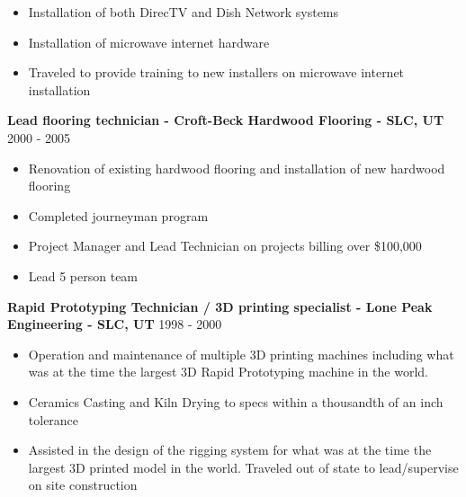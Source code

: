 \documentclass[line,margin]{res}
\begin{document}
\begin{resume}
\begin{itemize}
  \item Installation of both DirecTV and Dish Network systems
  \item Installation of microwave internet hardware
  \item Traveled to provide training to new installers on microwave internet installation
  \end{itemize} 	
{\bf Lead flooring technician - Croft-Beck Hardwood Flooring - SLC, UT} \hfill 2000 - 2005\\
  \begin{itemize} \itemsep -2pt
  \item Renovation of existing hardwood flooring and installation of new hardwood flooring
  \item Completed journeyman program
  \item Project Manager and Lead Technician on projects billing over \$100,000
  \item Lead 5 person team
  \end{itemize} 	
 {\bf Rapid Prototyping Technician / 3D printing specialist - Lone Peak Engineering - SLC, UT} \hfill 1998 - 2000\\
  \begin{itemize} \itemsep -2pt
  \item Operation and maintenance of multiple 3D printing machines including what was at the time the largest 3D Rapid Prototyping machine in the world. 
  \item Ceramics Casting and Kiln Drying to specs within a thousandth of an inch tolerance 
  \item Assisted in the design of the rigging system for what was at the time the largest 3D printed model in the world. Traveled out of state to lead/supervise on site construction
  \end{itemize} 	

\end{resume}
\end{document}
